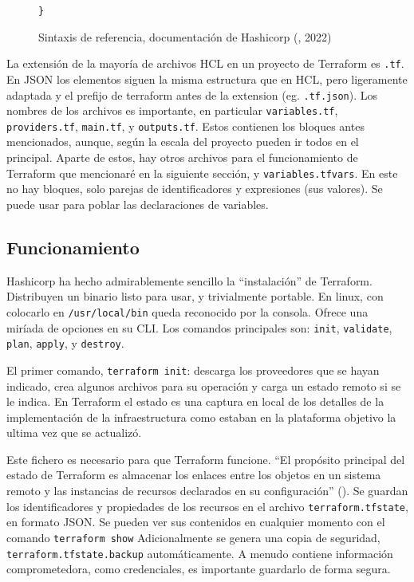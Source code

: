 \documentclass[11pt]{article}
\begin{document}
\begin{flushleft}
\begin{figure}[htb]
		\hspace{3.5cm}		
		\texttt{\}}
		\caption{Sintaxis de referencia, documentación de Hashicorp (\cite{hashicorp_lang1}, 2022)}
	\end{figure}
	

La extensión de la mayoría de archivos HCL en un proyecto de Terraform es \texttt{.tf}. En JSON los elementos siguen la misma estructura que en HCL, pero ligeramente adaptada y el prefijo de terraform antes de la extension (eg. \texttt{.tf.json}). Los nombres de los archivos es importante, en particular \texttt{variables.tf}, \texttt{providers.tf}, \texttt{main.tf}, y \texttt{outputs.tf}. Estos contienen los bloques antes mencionados, aunque, según la escala del proyecto pueden ir todos en el principal. Aparte de estos, hay otros archivos para el funcionamiento de Terraform que mencionaré en la siguiente sección, y \texttt{variables.tfvars}. En este no hay bloques, solo parejas de identificadores y expresiones (sus valores). Se puede usar para poblar las declaraciones de variables.






	\clearpage
	\subsection{Funcionamiento}
		Hashicorp ha hecho admirablemente sencillo la ``instalación'' de Terraform. Distribuyen un binario listo para usar, y trivialmente portable. En linux, con colocarlo en \texttt{/usr/local/bin} queda reconocido por la consola. Ofrece una miríada de opciones en su CLI. Los comandos principales son: \texttt{init}, \texttt{validate}, \texttt{plan}, \texttt{apply}, y \texttt{destroy}. 
		\linebreak
		
		El primer comando, \texttt{terraform init}: descarga los proveedores que se hayan indicado, crea algunos archivos para su operación y carga un estado remoto si se le indica. En Terraform el estado es una captura en local de los detalles de la implementación de la infraestructura como estaban en la plataforma objetivo la ultima vez que se actualizó. 
		\linebreak
		
		Este fichero es necesario para que Terraform funcione. ``El propósito principal del estado de Terraform es almacenar los enlaces entre los objetos en un sistema remoto y las instancias de recursos declarados en su configuración'' (\cite{hashicorp_state}). Se guardan los identificadores y propiedades de los recursos en el archivo \texttt{terraform.tfstate}, en formato JSON. Se pueden ver sus contenidos en cualquier momento con el comando \texttt{terraform show} Adicionalmente se genera una copia de seguridad, \texttt{terraform.tfstate.backup} automáticamente. A menudo contiene información comprometedora, como credenciales, es importante guardarlo de forma segura. 
		\linebreak
		

\end{flushleft}
\end{document}
